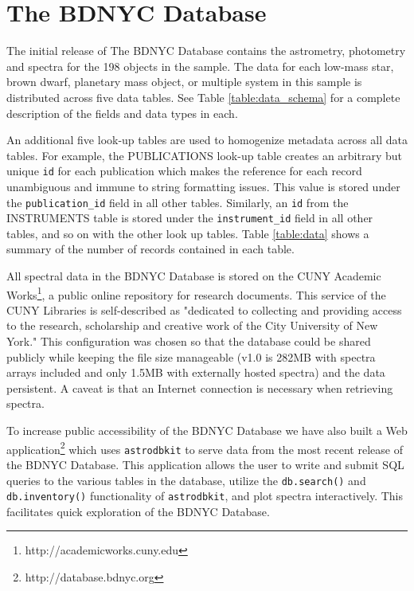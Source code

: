 \documentclass[iop,revtex4,natbib209]{emulateapj}
\begin{document}
\appendix

\section{The BDNYC Database}{\label{sec:appendix}}
The initial release of The BDNYC Database contains the astrometry, photometry and spectra for the 198 objects in the \citet{Fili15} sample. The data for each low-mass star, brown dwarf, planetary mass object, or multiple system in this sample is distributed across five data tables. See Table \ref{table:data_schema} for a complete description of the fields and data types in each. 

An additional five look-up tables are used to homogenize metadata across all data tables. For example, the PUBLICATIONS look-up table creates an arbitrary but unique \texttt{id} for each publication which makes the reference for each record unambiguous and immune to string formatting issues. This value is stored under the \texttt{publication\_id} field in all other tables. Similarly, an \texttt{id} from the INSTRUMENTS table is stored under the \texttt{instrument\_id} field in all other tables, and so on with the other look up tables. Table \ref{table:data} shows a summary of the number of records contained in each table.

All spectral data in the BDNYC Database is stored on the CUNY Academic Works\footnote{http://academicworks.cuny.edu}, a public online repository for research documents. This service of the CUNY Libraries is self-described as "dedicated to collecting and providing access to the research, scholarship and creative work of the City University of New York." This configuration was chosen so that the database could be shared publicly while keeping the file size manageable (v1.0 is 282MB with spectra arrays included and only 1.5MB with externally hosted spectra) and the data persistent. A caveat is that an Internet connection is necessary when retrieving spectra.

To increase public accessibility of the BDNYC Database we have also built a Web application\footnote{http://database.bdnyc.org} which uses \texttt{astrodbkit} to serve data from the most recent release of the BDNYC Database. This application allows the user to write and submit SQL queries to the various tables in the database, utilize the \texttt{db.search()} and \texttt{db.inventory()} functionality of \texttt{astrodbkit}, and plot spectra interactively. This facilitates quick exploration of the BDNYC Database.
\end{document}
